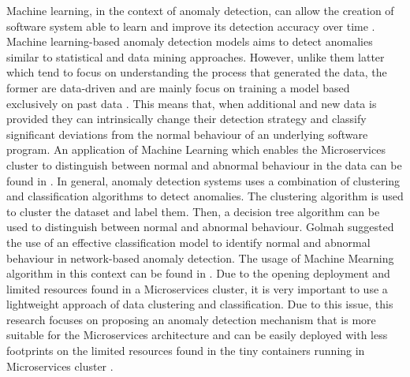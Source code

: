 \documentclass[sigconf]{acmart}
\begin{document}
Machine learning, in the context of  anomaly detection, can allow the creation of  software system able to learn and improve its detection accuracy over time \cite{bujlow2012method}.
Machine learning-based anomaly detection models aims to detect anomalies similar to statistical and data mining approaches. However, unlike them latter which tend to focus on understanding the process that generated the data, the former are data-driven and are mainly focus on training a model based exclusively on past data \cite{Patcha:2007hja}. This means that, when additional and new data is provided they can intrinsically change their detection strategy and classify significant deviations from the normal behaviour of an underlying software program.
An application of Machine Learning which enables the Microservices cluster to distinguish between normal and abnormal behaviour in the data can be found in \cite{Buczak:2016kt}. 
In general, anomaly detection systems uses a combination of clustering and classification algorithms to detect anomalies. The clustering algorithm is used to cluster the dataset and label them. Then, a decision tree algorithm can be used to distinguish between normal and abnormal behaviour.
Golmah \cite{golmah2014efficient} suggested the use of an effective classification model to identify normal and abnormal behaviour in network-based anomaly detection. The usage of Machine Mearning algorithm  in this context can be found in  \cite{golmah2014efficient,haq2015application,Buczak:2016kt}. Due to the  opening deployment and limited resources found in a Microservices cluster, it is very important to use a lightweight approach of data clustering and classification. Due to this issue, this research focuses on proposing an anomaly detection mechanism that is more suitable for the Microservices architecture and can be easily deployed with less footprints on the limited resources found in the tiny containers running in Microservices cluster . 
\end{document}
